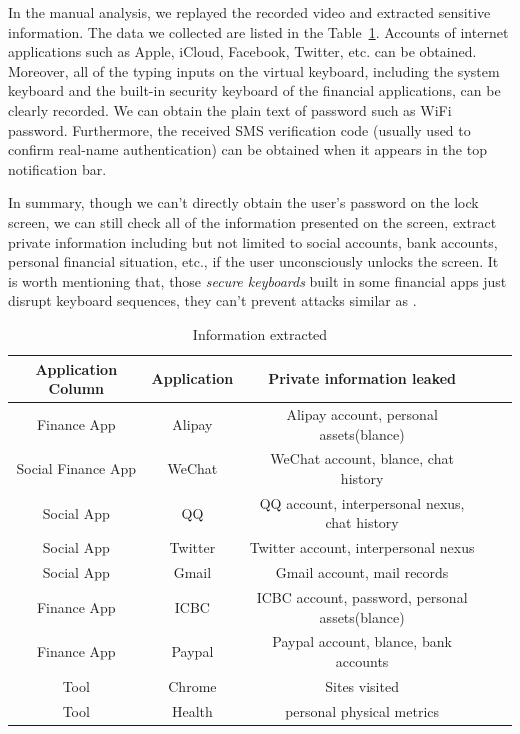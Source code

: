 In the manual analysis, we replayed the recorded video and extracted sensitive information.
The data we collected are listed in the Table~\ref{table:information_extracted}.
Accounts of internet applications such as Apple, iCloud, Facebook, Twitter, etc. can be obtained.
Moreover, all of the typing inputs on the virtual keyboard, including the system keyboard and the built-in security keyboard of the financial applications, can be clearly recorded.
We can obtain the plain text of password such as WiFi password.
Furthermore, the received SMS verification code (usually used to confirm real-name authentication) can be obtained when it appears in the top notification bar.

In summary, though we can't directly obtain the user's password on the lock screen, we can still check all of the information presented on the screen, extract private information including but not limited to social accounts, bank accounts, personal financial situation, etc., if the user unconsciously unlocks the screen.
It is worth mentioning that, those \textit{secure keyboards} built in some financial apps just disrupt keyboard sequences, they can't prevent attacks similar as \tool.

\begin{table}[t]
	\centering
	\begin{tabular}{|c|c|c|c|c|}
		\hline
		Application Column  & Application & Private information leaked                       \\
		\hline
		Finance App         & Alipay      & Alipay account, personal assets(blance)          \\
		\hline
		Social  Finance App & WeChat      & WeChat account, blance, chat history             \\
		\hline
		Social App          & QQ          & QQ account, interpersonal nexus, chat history    \\
		\hline
		Social App          & Twitter     & Twitter account, interpersonal nexus             \\
		\hline
		Social App          & Gmail       & Gmail account, mail records                      \\
		\hline
		Finance App         & ICBC        & ICBC account, password, personal assets(blance)  \\
		\hline
		Finance App         & Paypal      & Paypal account, blance, bank accounts            \\
		\hline
		Tool                & Chrome      & Sites visited                                    \\
		\hline
		Tool                & Health      & personal physical metrics      					 \\
		\hline
	\end{tabular}
	\linebreak
	\caption{Information extracted}
	\label{table:information_extracted}
\end{table}
